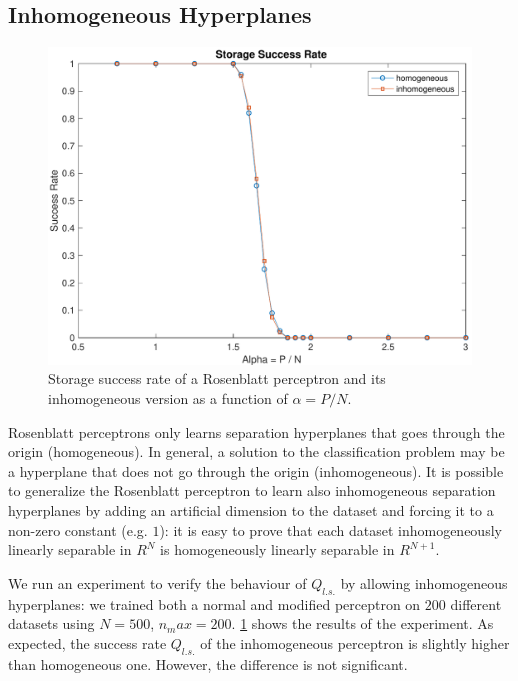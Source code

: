 \subsection{Inhomogeneous Hyperplanes}
\label{subsec:homogeneous}
\begin{figure}[t]
	\centering
	\includegraphics[width=\columnwidth]{figures/homogeneous}
    \caption{Storage success rate of a Rosenblatt perceptron and its inhomogeneous version as a function of $\alpha = P / N$.}
	\label{fig:homogeneous}
\end{figure}

Rosenblatt perceptrons only learns separation hyperplanes that goes through the origin (homogeneous).
In general, a solution to the classification problem may be a hyperplane that does not go through the origin (inhomogeneous).
It is possible to generalize the Rosenblatt perceptron to learn also inhomogeneous separation hyperplanes by adding an artificial dimension to the dataset and forcing it to a non-zero constant (e.g. $1$):
it is easy to prove that each dataset inhomogeneously linearly separable in $R^N$ is homogeneously linearly separable in $R^{N+1}$.

We run an experiment to verify the behaviour of $Q_{l.s.}$ by allowing inhomogeneous hyperplanes:
we trained both a normal and modified perceptron on $200$ different datasets using $N = 500$, $n_max = 200$. 
\cref{fig:homogeneous} shows the results of the experiment.
As expected, the success rate $Q_{l.s.}$ of the inhomogeneous perceptron is slightly higher than homogeneous one.
However, the difference is not significant.

